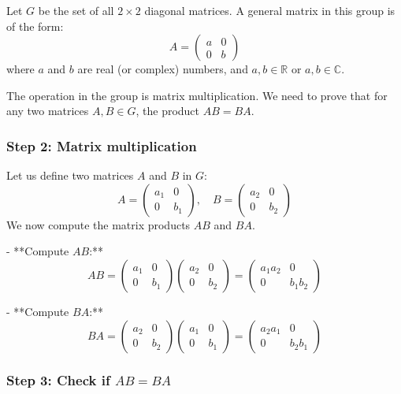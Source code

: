 \documentclass{article}
\begin{document}
Let \( G \) be the set of all \( 2 \times 2 \) diagonal matrices. A general matrix in this group is of the form:
\[
A = \begin{pmatrix} a & 0 \\ 0 & b \end{pmatrix}
\]
where \( a \) and \( b \) are real (or complex) numbers, and \( a, b \in \mathbb{R} \) or \( a, b \in \mathbb{C} \).

The operation in the group is matrix multiplication. We need to prove that for any two matrices \( A, B \in G \), the product \( AB = BA \).

\subsubsection*{Step 2: Matrix multiplication}

Let us define two matrices \( A \) and \( B \) in \( G \):
\[
A = \begin{pmatrix} a_1 & 0 \\ 0 & b_1 \end{pmatrix}, \quad B = \begin{pmatrix} a_2 & 0 \\ 0 & b_2 \end{pmatrix}
\]
We now compute the matrix products \( AB \) and \( BA \).

- **Compute \( AB \):**
\[
AB = \begin{pmatrix} a_1 & 0 \\ 0 & b_1 \end{pmatrix} \begin{pmatrix} a_2 & 0 \\ 0 & b_2 \end{pmatrix} = \begin{pmatrix} a_1 a_2 & 0 \\ 0 & b_1 b_2 \end{pmatrix}
\]

- **Compute \( BA \):**
\[
BA = \begin{pmatrix} a_2 & 0 \\ 0 & b_2 \end{pmatrix} \begin{pmatrix} a_1 & 0 \\ 0 & b_1 \end{pmatrix} = \begin{pmatrix} a_2 a_1 & 0 \\ 0 & b_2 b_1 \end{pmatrix}
\]

\subsubsection*{Step 3: Check if \( AB = BA \)}
\end{document}
